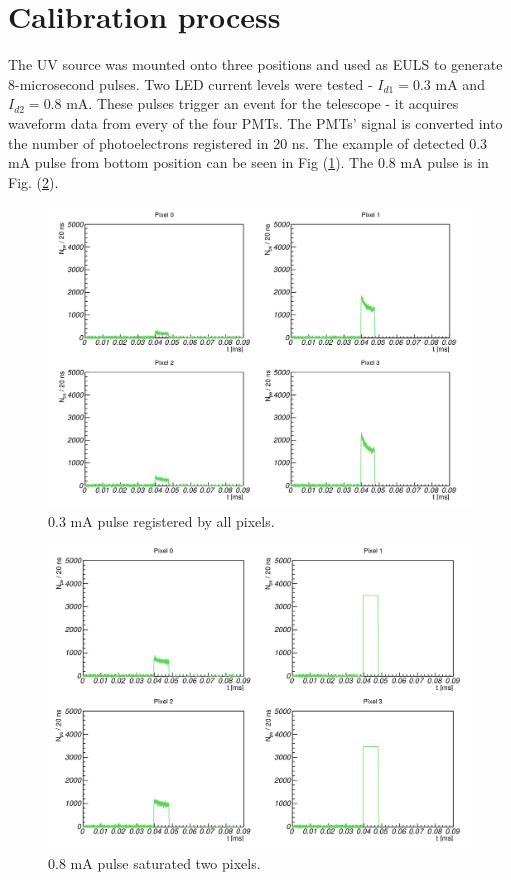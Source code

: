 \section{Calibration process}
The UV source was mounted onto three positions and used as EULS to generate 8-microsecond pulses. Two LED current levels were tested - $I_{d1} = 0.3$ mA and $I_{d2} = 0.8$ mA. These pulses trigger an event for the telescope - it acquires waveform data from every of the four PMTs. The PMTs' signal is converted into the number of photoelectrons registered in 20 ns. The example of detected 0.3 mA pulse from bottom position can be seen in Fig (\ref{03pulse}). The 0.8 mA pulse is in Fig. (\ref{08pulse}).

\begin{figure}[H]
 \centering
 \includegraphics[scale=0.42, angle = 0]{./pictures/CalibPulses.png}
 \caption{0.3 mA pulse registered by all pixels.}
 \label{03pulse}
 
\end{figure}

\begin{figure}[H]
 \centering
 \includegraphics[scale=0.42, angle = 0]{./pictures/CalibSaturated.png}
 \caption{0.8 mA pulse saturated two pixels.}
 \label{08pulse}
 
\end{figure}


